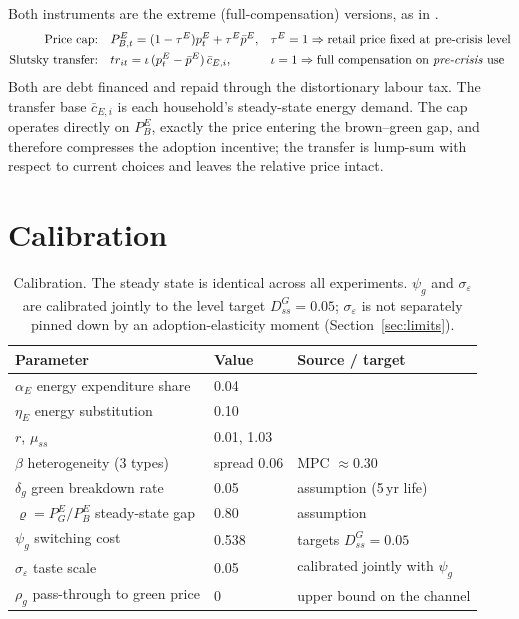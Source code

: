\documentclass[11pt,a4paper]{article}
\begin{document}
Both instruments are the extreme (full-compensation) versions, as in
\citet{Bayer2026}.
\begin{align}
\text{Price cap:}\quad & P^{E}_{B,t}=(1-\tau^{E})p^{E}_{t}+\tau^{E}\bar p^{E},
&& \tau^{E}=1 \Rightarrow \text{retail price fixed at pre-crisis level}\\
\text{Slutsky transfer:}\quad & tr_{it}=\iota\,(p^{E}_{t}-\bar p^{E})\,\bar c_{E,i},
&& \iota=1 \Rightarrow \text{full compensation on \emph{pre-crisis} use}
\end{align}
Both are debt financed and repaid through the distortionary labour tax. The
transfer base $\bar c_{E,i}$ is each household's steady-state energy demand.
The cap operates directly on $P^{E}_{B}$, exactly the price entering the
brown--green gap, and therefore compresses the adoption incentive; the
transfer is lump-sum with respect to current choices and leaves the relative
price intact.

\section{Calibration}

\begin{table}[h]\centering
\small
\begin{tabular}{lll}
\toprule
Parameter & Value & Source / target \\
\midrule
$\alpha_E$ energy expenditure share & 0.04 & \citet{ARS2024} \\
$\eta_E$ energy substitution & 0.10 & \citet{ARS2024} \\
$r$, $\mu_{ss}$ & 0.01, 1.03 & \citet{ARS2024} \\
$\beta$ heterogeneity (3 types) & spread 0.06 & MPC $\approx0.30$ \\
\midrule
$\delta_g$ green breakdown rate & 0.05 & assumption (5\,yr life) \\
$\varrho=P^{E}_{G}/P^{E}_{B}$ steady-state gap & 0.80 & assumption \\
$\psi_g$ switching cost & 0.538 & targets $D^{G}_{ss}=0.05$ \\
$\sigma_{\varepsilon}$ taste scale & 0.05 & calibrated jointly with $\psi_g$ \\
$\rho_g$ pass-through to green price & 0 & upper bound on the channel \\
\bottomrule
\end{tabular}
\caption{Calibration. The steady state is identical across all experiments.
$\psi_g$ and $\sigma_\varepsilon$ are calibrated jointly to the level target
$D^{G}_{ss}=0.05$; $\sigma_\varepsilon$ is not separately pinned down by an
adoption-elasticity moment (Section~\ref{sec:limits}).}
\end{table}
\end{document}

